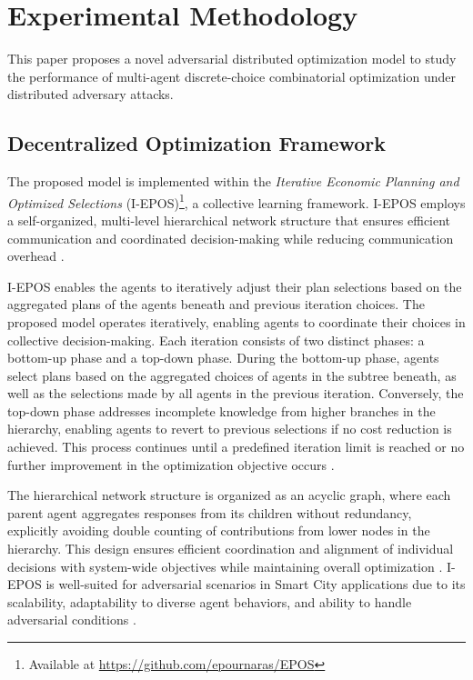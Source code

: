 \documentclass[journal]{IEEEtran}
\begin{document}
\section{Experimental Methodology} \label{sec4}
This paper proposes a novel adversarial distributed optimization model to study the performance of multi-agent discrete-choice combinatorial optimization
under distributed adversary attacks.

\subsection{Decentralized Optimization Framework}\label{sec4-1}
The proposed model is implemented within the \textit{Iterative Economic Planning and Optimized Selections} (I-EPOS)\footnote{Available at \url{https://github.com/epournaras/EPOS}}, a collective learning framework. I-EPOS employs a self-organized, multi-level hierarchical network structure that ensures efficient communication and coordinated decision-making while reducing communication overhead \cite{pournaras2013multi}. 

I-EPOS enables the agents to iteratively adjust their plan selections based on the aggregated plans of the agents beneath and previous iteration choices. The proposed model operates iteratively, enabling agents to coordinate their choices in collective decision-making. Each iteration consists of two distinct phases: a bottom-up phase and a top-down phase. During the bottom-up phase, agents select plans based on the aggregated choices of agents in the subtree beneath, as well as the selections made by all agents in the previous iteration. Conversely, the top-down phase addresses incomplete knowledge from higher branches in the hierarchy, enabling agents to revert to previous selections if no cost reduction is achieved. This process continues until a predefined iteration limit is reached or no further improvement in the optimization objective occurs \cite{pournaras2018decentralized, pournaras2020collective}.

The hierarchical network structure is organized as an acyclic graph, where each parent agent aggregates responses from its children without redundancy, explicitly avoiding double counting of contributions from lower nodes in the hierarchy. This design ensures efficient coordination and alignment of individual decisions with system-wide objectives while maintaining overall optimization \cite{pournaras2018decentralized, pournaras2013multi, pournaras2020holarchic}. I-EPOS is well-suited for adversarial scenarios in Smart City applications due to its scalability, adaptability to diverse agent behaviors, and ability to handle adversarial conditions \cite{pournaras2020collective, pournaras2024collective}. 
\end{document}
